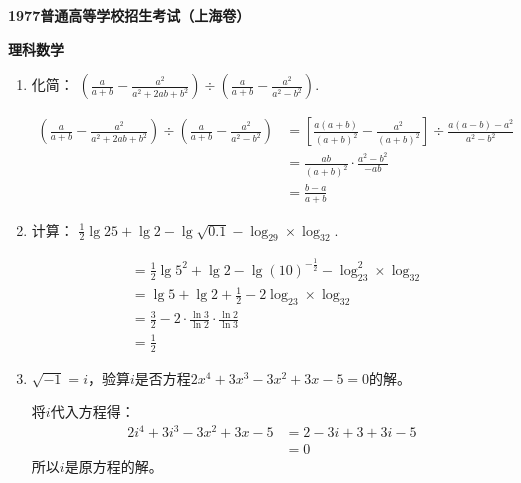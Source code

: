 \documentclass[answers]{exam}
\begin{document}
\begin{center}
	\textbf{1977普通高等学校招生考试（上海卷）}

	\textbf{\Huge 理科数学}
\end{center}
\begin{questions}
	\question
	\begin{enumerate}[label=(\arabic*)]
		\item 化简：
		      \begin{math} \displaystyle
			      \left(\frac{a}{a+b} - \frac{a^2}{a^2 + 2ab + b^2}\right) \div \left(\frac{a}{a+b} - \frac{a^2}{a^2 - b^2}\right)
		      \end{math}.
		      \begin{solution}
			      \begin{align*}
				      \left(\frac{a}{a+b} - \frac{a^2}{a^2 + 2ab + b^2}\right) \div \left(\frac{a}{a+b} - \frac{a^2}{a^2 - b^2}\right)
				       & = \left[ \frac{a(a+b)}{(a+b)^2} - \frac{a^2}{(a+b)^2} \right] \div \frac{a(a-b) - a^2}{a^2-b^2}
				      \\
				       & = \frac{ab}{(a+b)^2} \cdot \frac{a^2 - b^2}{-ab}                                                \\
				       & = \frac{b-a}{a+b}
			      \end{align*}
		      \end{solution}
		\item 计算：
		      \begin{math}
			      \displaystyle
			      \frac12\lg25+\lg2 - \lg\sqrt{0.1} - \log_29 \times \log_32.
		      \end{math}
		      \begin{solution}
			      \begin{align*}
				       & = \frac12\lg5^2 + \lg2 - \lg(10)^{-\frac12} - \log_23^2 \times \log_32 \\
				       & = \lg5 + \lg2 + \frac12 - 2 \log_23 \times \log_32                     \\
				       & = \frac32 - 2 \cdot \frac{\ln3}{\ln2}\cdot \frac{\ln2}{\ln3}           \\
				       & = \frac12
			      \end{align*}
		      \end{solution}
		\item $\sqrt{-1} = i$，验算$i$是否方程$2x^4 + 3x^3 - 3x^2 + 3x - 5 = 0$的解。
		      \begin{solution}
			      将$i$代入方程得：
			      \begin{align*}
				      2i^4 + 3i^3 - 3x^2 + 3x - 5 & = 2 - 3i + 3  + 3i - 5 \\ 
												  &= 0
			      \end{align*}
				  所以$i$是原方程的解。
		      \end{solution}

	\end{enumerate}

\end{questions}
\end{document}
